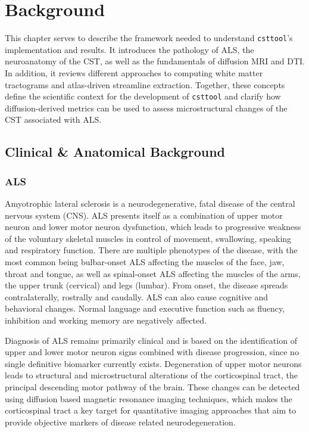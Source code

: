 
\chapter{Background}
\label{ch:background}

This chapter serves to describe the framework needed to understand \texttt{csttool}'s implementation and results. It introduces the pathology of ALS, the neuroanatomy of the CST, as well as the fundamentals of diffusion MRI and DTI. In addition, it reviews different approaches to computing white matter tractograms and atlas-driven streamline extraction. Together, these concepts define the scientific context for the development of \texttt{csttool} and clarify how diffusion-derived metrics can be used to assess microstructural changes of the CST associated with ALS. 

\section{Clinical \& Anatomical Background}
\label{sec:background_anatomicalbackground}

\subsection{ALS}
Amyotrophic lateral sclerosis is a neurodegenerative, fatal disease of the central nervous system (CNS). ALS presents itself as a combination of upper motor neuron and lower motor neuron dysfunction, which leads to progressive weakness of the voluntary skeletal muscles in control of movement, swallowing, speaking and respiratory function. There are multiple phenotypes of the disease, with the most common being bulbar-onset ALS affecting the muscles of the face, jaw, throat and tongue, as well as spinal-onset ALS affecting the muscles of the arms, the upper trunk (cervical) and legs (lumbar). From onset, the disease spreads contralaterally, rostrally and caudally. ALS can also cause cognitive and behavioral changes. Normal language and executive function such as fluency, inhibition and working memory are negatively affected. \cite{feldman_amyotrophic_2022}

Diagnosis of ALS remains primarily clinical and is based on the identification of upper and lower motor neuron signs combined with disease progression, since no single definitive biomarker currently exists. Degeneration of upper motor neurons leads to structural and microstructural alterations of the corticospinal tract, the principal descending motor pathway of the brain. These changes can be detected using diffusion based magnetic resonance imaging techniques, which makes the corticospinal tract a key target for quantitative imaging approaches that aim to provide objective markers of disease related neurodegeneration.

